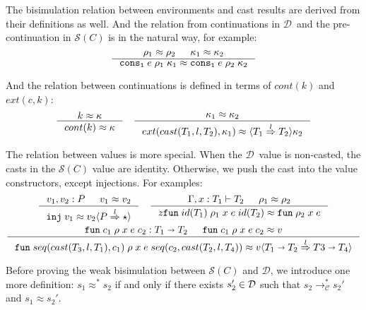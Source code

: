 \documentclass[acmsmall,review,anonymous]{acmart}\settopmatter{printfolios=true,printccs=false,printacmref=false}
\newcommand{\TOOdyn}[0]{\star}
\newcommand{\POOfun}[2]{#1 \shortrightarrow #2}
\newcommand{\cOOcast}[3]{#1 \overset{#2}{\Rightarrow} #3}
\newcommand{\vOOcast}[2]{#1\langle#2\rangle}
\newcommand{\vOOfun}[3]{\mathtt{fun} \; #1 \; #2 \; #3}
\newcommand{\kOOconsI}[3]{\mathtt{cons_1} \; #1 \; #2 \; #3}
\newcommand{\kOOcast}[2]{
	\langle #1 \rangle #2}
\newcommand{\hcvOOinj}[2]{\mathtt{inj} \; #2}
\newcommand{\hcvOOfun}[5]{\mathtt{fun} \; #1 \; #2 \; #3 \; #4 \; #5}
\newcommand{\hcvOOcons}[4]{\mathtt{cons}\;#1\;#2\;#3\;#4}
\newcommand{\judgeCreduceTrans}[2]{#1 \longrightarrow_{\mathcal{C}}^{*} #2}
\newcommand{\ineffCEKD}{$ \mathcal{D} $}
\newcommand{\effCEK}[1]{$ \mathcal{S}(#1) $}
\begin{document}
The bisimulation relation between environments and cast results are derived 
from their definitions as well. And the relation from continuations in 
\ineffCEKD\ and the pre-continuation in \effCEK{C} is in the natural way, for 
example: \begin{gather*}
\inference{
	\rho_1 \approx \rho_2 &
	\kappa_1 \approx \kappa_2
}{
	\kOOconsI{e}{\rho_1}{\kappa_1} \approx \kOOconsI{e}{\rho_2}{\kappa_2}
}
\end{gather*}

And the relation between continuations is defined in terms of $ cont(k) $ and $ 
ext(c,k) $: \begin{gather*}
\inference{
	k \approx \kappa
}{
	cont(k) \approx \kappa
}
\quad
\inference{
	\kappa_1 \approx \kappa_2
}{
	ext(cast(T_1,l,T_2),\kappa_1)
	\approx
	\kOOcast{\cOOcast{T_1}{l}{T_2}}{\kappa_2} 
}
\end{gather*}

The relation between values is more special. When the \ineffCEKD\ value is 
non-casted, the casts in the \effCEK{C} value are identity. Otherwise, we push 
the cast into the value constructors, except injections. For examples: 
\begin{gather*}
\inference{
	v_1, v_2 : P &
	v_1 \approx v_2
}{
	\hcvOOinj{P_1}{v_1} \approx \vOOcast{v_2}{\cOOcast{P}{l}{\TOOdyn}}
}
\quad
\inference{
	\Gamma , x : T_1 \vdash T_2 &
	\rho_1 \approx \rho_2
}{z
	\hcvOOfun{id(T_1)}{\rho_1}{x}{e}{id(T_2)} \approx \vOOfun{\rho_2}{x}{e}
}
\\
\inference{
	\hcvOOfun{c_1}{\rho}{x}{e}{c_2} : \POOfun{T_1}{T_2} &
	\hcvOOfun{c_1}{\rho}{x}{e}{c_2} \approx v
}{
	\hcvOOfun{seq(cast(T_3,l,T_1), c_1)}{\rho}{x}{e}{seq(c_2,cast(T_2,l,T_4))}
	\approx
	\vOOcast{v}{\cOOcast{\POOfun{T_1}{T_2}}{l}{\POOfun{T3}{T_4}}}
}
\end{gather*}

Before proving the weak bisimulation between \effCEK{C} and \ineffCEKD, we 
introduce one more definition: $ s_1 \approx^{*} s_2 $ if and only if there 
exists $ s_2' \in \text{\ineffCEKD} $ 
such that $ \judgeCreduceTrans{s_2}{s_2'}$ and $ s_1 \approx s_2' $.
\end{document}
